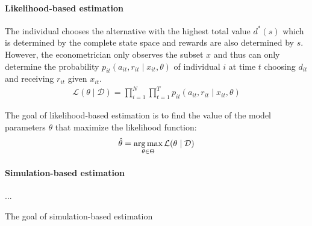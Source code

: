 \paragraph{Likelihood-based estimation} The individual chooses the alternative with the highest total value $d^*(s)$ which is determined by the complete state space and rewards are also determined by $s$. However, the econometrician only observes the subset $x$ and thus can only determine the probability $p_{it}(a_{it}, r_{it} \mid x_{it}, \theta)$ of individual $i$ at time $t$ choosing $d_{it}$ and receiving $r_{it}$ given $x_{it}$.
%
\begin{align*}
  \mathcal{L}(\theta\mid\mathcal{D}) = \prod^N_{i= 1} \prod^T_{t= 1} p_{it}(a_{it}, r_{it} \mid x_{it}, \theta)
\end{align*}

The goal of likelihood-based estimation is to find the value of the model parameters $\theta$ that maximize the likelihood function:
%
\begin{align*}
\hat{\theta} = \operatorname*{arg\,max}_{\theta \in \Theta} \mathcal{L}(\theta\mid\mathcal{D})
\end{align*}

\paragraph{Simulation-based estimation} ...


The goal of simulation-based estimation
